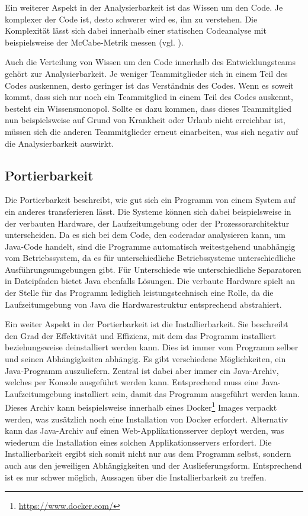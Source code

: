 \documentclass[
	oneside,  %
	ngerman, 
	final, 
	11pt, 
	a4paper, 
	1.1headlines, 
	headinclude=false, 
	footinclude=false, 
	mpinclude=false, 
	pagesize, 
	onecolumn, 
	titlepage, 
	parskip=half, 
	headsepline, 
	chapterprefix=false, 
	version=first, 
	listof=totoc, 
	bibliography=totoc, 
	toc=graduated, 
	fleqn
]{scrbook}
\begin{document}
Ein weiterer Aspekt in der Analysierbarkeit ist das Wissen um den Code.
Je komplexer der Code ist, desto schwerer wird es, ihn zu verstehen.
Die Komplexität lässt sich dabei innerhalb einer statischen Codeanalyse mit beispielsweise der McCabe-Metrik messen (vgl. \cite{MC1976}).

Auch die Verteilung von Wissen um den Code innerhalb des Entwicklungsteams gehört zur Analysierbarkeit.
Je weniger Teammitglieder sich in einem Teil des Codes auskennen, desto geringer ist das Verständnis des Codes.
Wenn es soweit kommt, dass sich nur noch ein Teammitglied in einem Teil des Codes auskennt, besteht ein Wissensmonopol.
Sollte es dazu kommen, dass dieses Teammitglied nun beispielsweise auf Grund von Krankheit oder Urlaub nicht erreichbar ist, müssen sich die anderen Teammitglieder erneut einarbeiten, was sich negativ auf die Analysierbarkeit auswirkt.

\subsection{Portierbarkeit}
Die Portierbarkeit beschreibt, wie gut sich ein Programm von einem System auf ein anderes transferieren lässt.
Die Systeme können sich dabei beispielsweise in der verbauten Hardware, der Laufzeitumgebung oder der Prozessorarchitektur unterscheiden.
Da es sich bei dem Code, den coderadar analysieren kann, um Java-Code handelt, sind die Programme automatisch weitestgehend unabhängig vom Betriebssystem, da es für unterschiedliche Betriebssysteme unterschiedliche Ausführungsumgebungen gibt.
Für Unterschiede wie unterschiedliche Separatoren in Dateipfaden bietet Java ebenfalls Lösungen.
Die verbaute Hardware spielt an der Stelle für das Programm lediglich leistungstechnisch eine Rolle, da die Laufzeitumgebung von Java die Hardwarestruktur entsprechend abstrahiert.

Ein weiter Aspekt in der Portierbarkeit ist die Installierbarkeit.
Sie beschreibt den Grad der Effektivität und Effizienz, mit dem das Programm installiert beziehungsweise deinstalliert werden kann.
Dies ist immer vom Programm selber und seinen Abhängigkeiten abhängig.
Es gibt verschiedene Möglichkeiten, ein Java-Programm auszuliefern.
Zentral ist dabei aber immer ein Java-Archiv, welches per Konsole ausgeführt werden kann.
Entsprechend muss eine Java-Laufzeitumgebung installiert sein, damit das Programm ausgeführt werden kann.
Dieses Archiv kann beispielsweise innerhalb eines Docker\footnote{\url{https://www.docker.com/}} Images verpackt werden, was zusätzlich noch eine Installation von Docker erfordert.
Alternativ kann das Java-Archiv auf einen Web-Applikationsserver deployt werden, was wiederum die Installation eines solchen Applikationsservers erfordert.
Die Installierbarkeit ergibt sich somit nicht nur aus dem Programm selbst, sondern auch aus den jeweiligen Abhängigkeiten und der Auslieferungsform.
Entsprechend ist es nur schwer möglich, Aussagen über die Installierbarkeit zu treffen.
\end{document}
